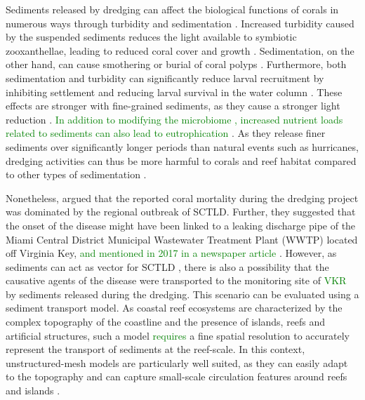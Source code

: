 \documentclass[preprint,12pt,authoryear]{elsarticle}
\newcommand{\modif}[1]{\textcolor{green}{#1}}
\begin{document}
Sediments released by dredging can affect the biological functions of corals in numerous ways  through turbidity and sedimentation \citep{erftemeijer2012environmental,jones2015effects}. Increased turbidity caused by the suspended sediments reduces the light available to symbiotic zooxanthellae, leading to reduced coral cover and growth \citep{kendall1983effects,rogers1990responses,anthony1999tank,hennige2008photoacclimation}. Sedimentation, on the other hand, can cause smothering or burial of coral polyps \citep{erftemeijer2012environmental,jones2015effects,jones2019sediment}. Furthermore, both sedimentation and turbidity can significantly reduce larval recruitment by inhibiting settlement and reducing larval survival in the water column \citep{jones2015effects}. These effects are stronger with fine-grained sediments, as they cause a stronger light reduction \citep{storlazzi2015influence,fourney2017additive}. \modif{In addition to modifying the microbiome \citep{rosales2019oceanographic}, increased nutrient loads related to sediments can also lead to eutrophication \citep{wittenberg1992effects}}.
As they release finer sediments over significantly longer periods than natural events such as hurricanes, dredging activities can thus be more harmful to corals and reef habitat compared to other types of sedimentation \citep{cunning2019extensive}.

Nonetheless, \cite{gintert2019regional} argued that the reported coral mortality during the dredging project was dominated by the regional outbreak of SCTLD. Further, they suggested that the onset of the disease might have been linked to a leaking discharge pipe of the Miami Central District Municipal Wastewater Treatment Plant (WWTP) located off Virginia Key, \modif{and mentioned in 2017 in a newspaper article \citep{staletovich2017}}. However, as sediments can act as vector for SCTLD \citep{studivan2022reef}, there is also a possibility that the causative agents of the disease were transported to the monitoring site of \modif{VKR} by sediments released during the dredging. This scenario can be evaluated using a sediment transport model. As coastal reef ecosystems are characterized by the complex topography of the coastline and the presence of islands, reefs and artificial structures, such a model \modif{requires} a fine spatial resolution to accurately represent the transport of sediments at the reef-scale. In this context, unstructured-mesh models are particularly well suited, as they can easily adapt to the topography \citep{fringer2019future} and can capture small-scale circulation features around reefs and islands \citep{lambrechts2008multi}.
\end{document}
